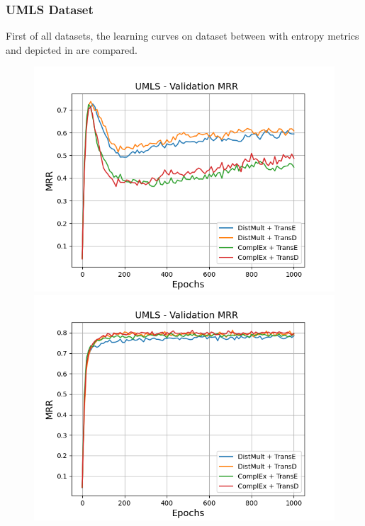 \subsubsection{UMLS Dataset}
\label{subsubsec:uncertainty_umls}
%
First of all datasets, the learning curves on \umls dataset between \ussoftmax with entropy metrics and \origsampling depicted in  are compared.
\begin{figure}
    \centering
    \begin{minipage}{.5\textwidth}
      \centering
      \includegraphics[width=0.9\linewidth]{figures/results/gan_train/not_pretrained/random/umls/epochs1000/random_umls_mrrs.png}
    \end{minipage}%
    \begin{minipage}{.5\textwidth}
      \centering
      \includegraphics[width=0.9\linewidth]{figures/results/gan_train/not_pretrained/uncertainty/max_distribution/entropy/umls/1k_epochs/uncertainty_umls_mrrs.png}

\end{minipage}
\end{figure}
